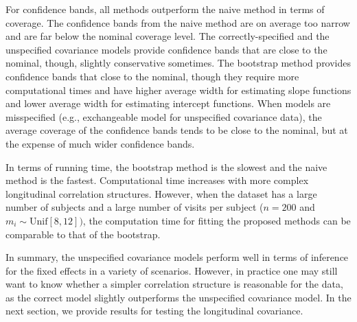 \documentclass[submit]{smj}
\begin{document}
For confidence bands, all  methods outperform the naive method in terms of coverage. The confidence bands from the naive method are on average too narrow and are far below the nominal coverage level. The correctly-specified and the unspecified covariance models provide confidence bands that are close to the nominal, though,  slightly conservative sometimes. The bootstrap method  provides confidence bands that close to the nominal, though they require more computational times and have  higher average width for estimating slope functions and lower average width for estimating intercept functions. When models are misspecified (e.g., exchangeable model for unspecified covariance data), the average coverage of the confidence bands tends to be close to the nominal, but at the expense of much wider confidence bands.


In terms of running time, the bootstrap method is the slowest and the naive method is the fastest. Computational time increases with more complex longitudinal correlation structures. However, when the dataset has a large number of subjects and a large number of visits per subject ($n=200$ and $m_i\sim \text{Unif}[8,12])$, the computation time for fitting the proposed methods can be comparable to that of the bootstrap. 

In summary, the unspecified covariance models perform well in terms of inference for the fixed effects in a variety of scenarios. However, in practice one may still want to know whether a simpler correlation structure is reasonable for the data, as the correct model slightly outperforms the unspecified covariance model. In the next section, we provide results for testing the longitudinal covariance.
\end{document}
